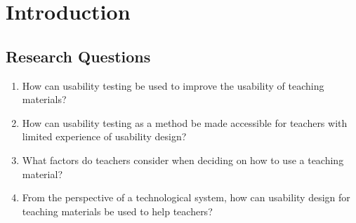 \chapter{Introduction}

\section{Research Questions}
\begin{enumerate}
	\item How can usability testing be used to improve the usability of teaching materials?
	\item How can usability testing as a method be made accessible for teachers with limited experience of usability design?
	\item What factors do teachers consider when deciding on how to use a teaching material?
	\item From the perspective of a technological system, how can usability design for teaching materials be used to help teachers?
\end{enumerate}


